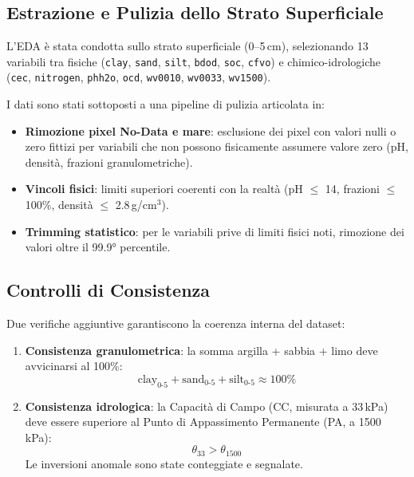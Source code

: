\documentclass[a4paper,12pt]{article}
\begin{document}
\subsection{Estrazione e Pulizia dello Strato Superficiale}

L'EDA è stata condotta sullo strato superficiale (0--5\,cm), selezionando
13 variabili tra fisiche (\texttt{clay}, \texttt{sand}, \texttt{silt},
\texttt{bdod}, \texttt{soc}, \texttt{cfvo}) e chimico-idrologiche
(\texttt{cec}, \texttt{nitrogen}, \texttt{phh2o}, \texttt{ocd},
\texttt{wv0010}, \texttt{wv0033}, \texttt{wv1500}).

I dati sono stati sottoposti a una pipeline di pulizia articolata in:

\begin{itemize}
    \item \textbf{Rimozione pixel No-Data e mare}: esclusione dei pixel
    con valori nulli o zero fittizi per variabili che non possono
    fisicamente assumere valore zero (pH, densità, frazioni
    granulometriche).

    \item \textbf{Vincoli fisici}: limiti superiori coerenti con la
    realtà (pH $\leq$ 14, frazioni $\leq$ 100\%, densità $\leq$
    2.8\,g/cm$^3$).

    \item \textbf{Trimming statistico}: per le variabili prive di
    limiti fisici noti, rimozione dei valori oltre il 99.9° percentile.
\end{itemize}

\subsection{Controlli di Consistenza}

Due verifiche aggiuntive garantiscono la coerenza interna del dataset:

\begin{enumerate}
    \item \textbf{Consistenza granulometrica}: la somma
    argilla + sabbia + limo deve avvicinarsi al 100\%:
    \[
        \text{clay}_{0\text{-}5} + \text{sand}_{0\text{-}5} +
        \text{silt}_{0\text{-}5} \approx 100\%
    \]

    \item \textbf{Consistenza idrologica}: la Capacità di Campo (CC,
    misurata a 33\,kPa) deve essere superiore al Punto di Appassimento
    Permanente (PA, a 1500\,kPa):
    \[
        \theta_{33} > \theta_{1500}
    \]
    Le inversioni anomale sono state conteggiate e segnalate.
\end{enumerate}
\end{document}

